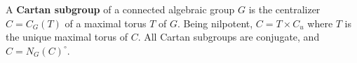 A \textbf{Cartan subgroup} of a connected algebraic group $G$ is the centralizer $C = C_G(T)$ of a maximal torus $T$ of $G$. Being nilpotent, $C = T \times C_u$ where $T$ is the unique maximal torus of $C$. All Cartan subgroups are conjugate, and $C = N_G(C)^\circ$.

